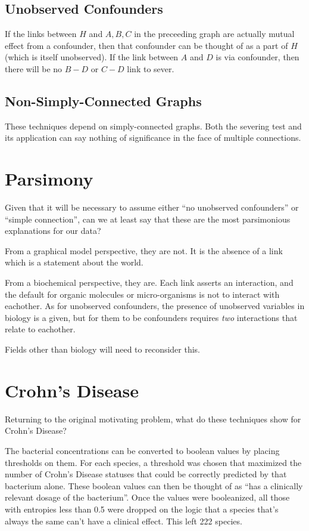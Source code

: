 \documentclass[twocolumn,12pt]{article}
\begin{document}
\subsection{Unobserved Confounders}

If the links between $H$ and $A,B,C$ in the preceeding graph are
actually mutual effect from a confounder, then that confounder can be
thought of as a part of $H$ (which is itself unobserved).  If the link
between $A$ and $D$ is via confounder, then there will be no $B-D$ or
$C-D$ link to sever.

\subsection{Non-Simply-Connected Graphs}

These techniques depend on simply-connected graphs.  Both the severing
test and its application can say nothing of significance in the face
of multiple connections.

\section{Parsimony}

Given that it will be necessary to assume either ``no unobserved
confounders'' or ``simple connection'', can we at least say that these
are the most parsimonious explanations for our data?

From a graphical model perspective, they are not.  It is the absence
of a link which is a statement about the world.

From a biochemical perspective, they are.  Each link asserts an
interaction, and the default for organic molecules or micro-organisms
is not to interact with eachother.  As for unobserved confounders, the
presence of unobserved variables in biology is a given, but for them
to be confounders requires \textit{two} interactions that relate to
eachother.

Fields other than biology will need to reconsider this.

\section{Crohn's Disease}

Returning to the original motivating problem, what do these techniques
show for Crohn's Disease?

The bacterial concentrations can be converted to boolean values by
placing thresholds on them.  For each species, a threshold was chosen that
maximized the number of Crohn's Disease statuses that could be
correctly predicted by that bacterium alone.  These boolean values can
then be thought of as ``has a clinically relevant dosage of the
bacterium''.  Once the values were booleanized, all those with
entropies less than 0.5 were dropped on the logic that a species
that's always the same can't have a clinical effect.  This left 222
species.
\end{document}
